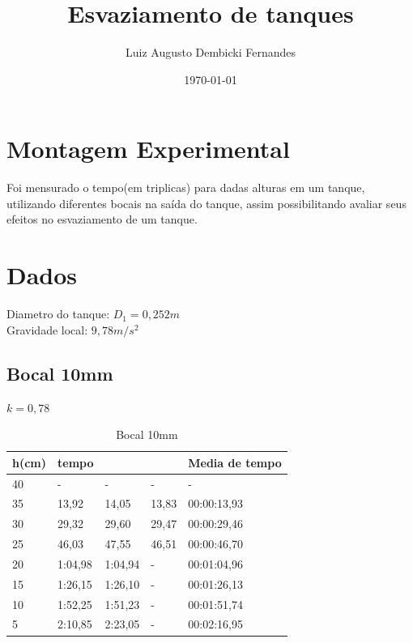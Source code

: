 \documentclass[12pt]{article}
\begin{document}
\title{Esvaziamento de tanques}
\author{Luiz Augusto Dembicki Fernandes}
\date{\today}

\maketitle

\begin{abstract}

\end{abstract}

\section{Montagem Experimental}

\tab  Foi mensurado o tempo(em triplicas) para dadas alturas em um tanque, utilizando diferentes bocais na saída do tanque, assim possibilitando avaliar seus efeitos no esvaziamento de um tanque.

\section{Dados}
Diametro do tanque: $ D_1 = 0,252m $ \\
Gravidade local: $ 9,78 m/s^2 $
\subsection[short]{Bocal 10mm}
$ k = 0,78 $
\begin{table}[H]
    \begin{tabular}{|l|lll|l|}
        \hline
        h(cm) & tempo                        &                              &       & Media de tempo \\ \hline
        40    & \multicolumn{1}{l|}{-}       & \multicolumn{1}{l|}{-}       & -     & -              \\ \hline
        35    & \multicolumn{1}{l|}{13,92}   & \multicolumn{1}{l|}{14,05}   & 13,83 & 00:00:13,93    \\ \hline
        30    & \multicolumn{1}{l|}{29,32}   & \multicolumn{1}{l|}{29,60}   & 29,47 & 00:00:29,46    \\ \hline
        25    & \multicolumn{1}{l|}{46,03}   & \multicolumn{1}{l|}{47,55}   & 46,51 & 00:00:46,70    \\ \hline
        20    & \multicolumn{1}{l|}{1:04,98} & \multicolumn{1}{l|}{1:04,94} & -     & 00:01:04,96    \\ \hline
        15    & \multicolumn{1}{l|}{1:26,15} & \multicolumn{1}{l|}{1:26,10} & -     & 00:01:26,13    \\ \hline
        10    & \multicolumn{1}{l|}{1:52,25} & \multicolumn{1}{l|}{1:51,23} & -     & 00:01:51,74    \\ \hline
        5     & \multicolumn{1}{l|}{2:10,85} & \multicolumn{1}{l|}{2:23,05} & -     & 00:02:16,95    \\ \hline
    \end{tabular}
    \caption{Bocal 10mm}
\end{table}
\end{document}
